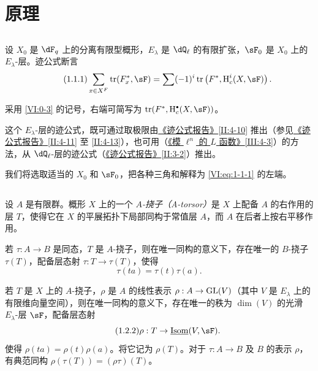\section{原理}\label{VI:1}

\subsection{}\label{VI:1-1}

设 $X_0$ 是 $\dF_q$ 上的分离有限型概形，$E_\lambda$ 是 $\dQ_\ell$ 的有限扩张，$\sF_0$ 是 $X_0$ 上的 $E_\lambda$-层。迹公式断言
\begin{equation*}\tag{1.1.1}\label{VI:eq:1-1-1}
  \sum_{x\in X^F} \tr(F_x^\ast,\sF) = \sum (-1)^i \tr\left(F^\ast,\h_c^i(X,\sF)\right) \text{.}
\end{equation*}

采用 \ref{VI:0-3} 的记号，右端可简写为 $\tr(F^\ast,\h_c^\bullet(X,\sF))$。

这个 $E_\lambda$-层的迹公式，既可通过取极限由\hyperref[II]{《迹公式报告》}\ref{II:4-10} 推出（参见\hyperref[II]{《迹公式报告》}\ref{II:4-11} 至 \ref{II:4-13}），也可用（\hyperref[III]{《模 $\ell^n$ 的 $L$ 函数》}\ref{III:4-3}）的方法，从 $\dQ_\ell$-层的迹公式（\hyperref[II]{《迹公式报告》}\ref{II:3-2}）推出。

我们将选取适当的 $X_0$ 和 $\sF_0$，把各种三角和解释为 \eqref{VI:eq:1-1-1} 的左端。

\subsection{}\label{VI:1-2}

设 $A$ 是有限群。概形 $X$ 上的一个 \emph{$A$-挠子（A-torsor）}是 $X$ 上配备 $A$ 的右作用的层 $T$，使得它在 $X$ 的平展拓扑下局部同构于常值层 $A$，而 $A$ 在后者上按右平移作用。

若 $\tau:A\to B$ 是同态，$T$ 是 $A$-挠子，则在唯一同构的意义下，存在唯一的 $B$-挠子 $\tau(T)$，配备层态射 $\tau:T\to \tau(T)$，使得
\begin{equation*}\tag{1.2.1}\label{VI:eq:1-2-1}
  \tau(t a) = \tau(t) \tau(a)\text{.}
\end{equation*}

若 $T$ 是 $X$ 上的 $A$-挠子，$\rho$ 是 $A$ 的线性表示 $\rho:A\to \operatorname{GL}(V)$（其中 $V$ 是 $E_\lambda$ 上的有限维向量空间），则在唯一同构的意义下，存在唯一的秩为 $\dim(V)$ 的光滑 $E_\lambda$-层 $\sF$，配备层态射
\begin{equation*}\tag{1.2.2}\label{VI:eq:1-2-2}
  \rho:T\to \underline{\operatorname{Isom}}(V,\sF) \text{.}
\end{equation*}
使得 $\rho(t a) = \rho(t) \rho(a)$。将它记为 $\rho(T)$。对于 $\tau:A\to B$ 及 $B$ 的表示 $\rho$，有典范同构 $\rho(\tau(T)) = (\rho\tau)(T)$。

